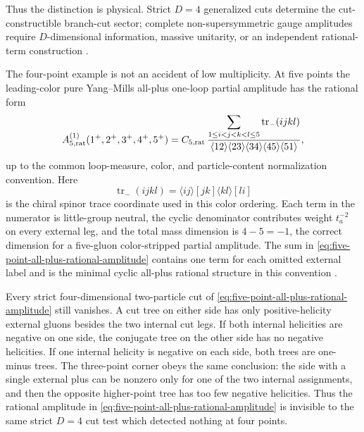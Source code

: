 Thus the distinction is physical.  Strict \(D=4\) generalized cuts determine
the cut-constructible branch-cut sector; complete non-supersymmetric gauge
amplitudes require \(D\)-dimensional information, massive unitarity, or an
independent rational-term construction
\cite{BernMorgan1996MassiveUnitarity,BrandhuberEtAl2005PureYMUnitarity}.

\begin{controlledapproximation}
\label{ca:five-point-all-plus-rational-amplitude}
The four-point example is not an accident of low multiplicity.  At five
points the leading-color pure Yang--Mills all-plus one-loop partial amplitude
has the rational form
\begin{equation}
  A_{5,\mathrm{rat}}^{(1)}(1^+,2^+,3^+,4^+,5^+)
  =
  C_{5,\rm rat}\,
  \frac{
    \displaystyle
    \sum_{1\le i<j<k<l\le5}
    \operatorname{tr}_{-}(i j k l)}
  {\langle12\rangle\langle23\rangle\langle34\rangle
   \langle45\rangle\langle51\rangle},
  \label{eq:five-point-all-plus-rational-amplitude}
\end{equation}
up to the common loop-measure, color, and particle-content normalization
convention.  Here
\begin{equation}
  \operatorname{tr}_{-}(i j k l)
  =
  \langle i j\rangle[j k]\langle k l\rangle[l i]
  \label{eq:five-point-all-plus-chiral-trace-coordinate}
\end{equation}
is the chiral spinor trace coordinate used in this color ordering.  Each term
in the numerator is little-group neutral, the cyclic denominator contributes
weight \(t_a^{-2}\) on every external leg, and the total mass dimension is
\(4-5=-1\), the correct dimension for a five-gluon color-stripped partial
amplitude.  The sum in
\eqref{eq:five-point-all-plus-rational-amplitude} contains one term for each
omitted external label and is the minimal cyclic all-plus rational structure
in this convention \cite{BDK1996OneLoopQCD}.

Every strict four-dimensional two-particle cut of
\eqref{eq:five-point-all-plus-rational-amplitude} still vanishes.  A cut
tree on either side has only positive-helicity external gluons besides the
two internal cut legs.  If both internal helicities are negative on one side,
the conjugate tree on the other side has no negative helicities.  If one
internal helicity is negative on each side, both trees are one-minus trees.
The three-point corner obeys the same conclusion: the side with a single
external plus can be nonzero only for one of the two internal assignments,
and then the opposite higher-point tree has too few negative helicities.  Thus
the rational amplitude in
\eqref{eq:five-point-all-plus-rational-amplitude} is invisible to the same
strict \(D=4\) cut test which detected nothing at four points.


\end{controlledapproximation}
